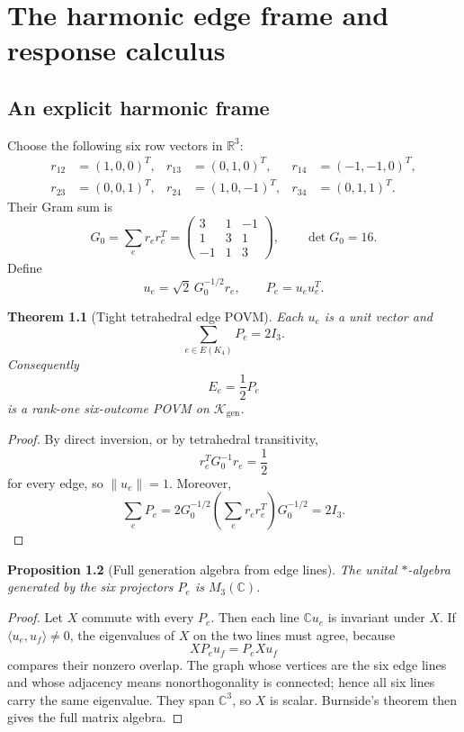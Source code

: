 \documentclass[11pt,oneside,openany]{book}
\numberwithin{equation}{chapter}
\newtheorem{theorem}{Theorem}[chapter]
\newtheorem{proposition}[theorem]{Proposition}
\theoremstyle{definition}
\theoremstyle{remark}
\newcommand{\C}{\mathbb C}
\newcommand{\R}{\mathbb R}
\newcommand{\Kgen}{\mathcal K_{\mathrm{gen}}}
\newcommand{\norm}[1]{\lVert #1\rVert}
\newcommand{\ip}[2]{\langle #1,#2\rangle}
\begin{document}
\chapter{The harmonic edge frame and response calculus}
\label{ch:edge-frame}

\section{An explicit harmonic frame}
Choose the following six row vectors in $\R^3$:
\[
\begin{aligned}
 r_{12}&=(1,0,0)^T,&
 r_{13}&=(0,1,0)^T,&
 r_{14}&=(-1,-1,0)^T,\\
 r_{23}&=(0,0,1)^T,&
 r_{24}&=(1,0,-1)^T,&
 r_{34}&=(0,1,1)^T.
\end{aligned}
\]
Their Gram sum is
\[
 G_0=\sum_er_er_e^T
 =\begin{pmatrix}3&1&-1\\1&3&1\\-1&1&3\end{pmatrix},
 \qquad \det G_0=16.
\]
Define
\[
 u_e=\sqrt2\,G_0^{-1/2}r_e,
 \qquad
 P_e=u_eu_e^T.
\]

\begin{theorem}[Tight tetrahedral edge POVM]
\label{thm:edge-povm}
Each $u_e$ is a unit vector and
\[
 \boxed{\sum_{e\in E(K_4)}P_e=2I_3.}
\]
Consequently
\[
 E_e=\frac12P_e
\]
is a rank-one six-outcome POVM on $\Kgen$.
\end{theorem}

\begin{proof}
By direct inversion, or by tetrahedral transitivity,
\[
 r_e^TG_0^{-1}r_e=\frac12
\]
for every edge, so $\norm{u_e}=1$.  Moreover,
\[
 \sum_eP_e
 =2G_0^{-1/2}\left(\sum_er_er_e^T\right)G_0^{-1/2}
 =2I_3.
\]
\end{proof}

\begin{proposition}[Full generation algebra from edge lines]
\label{prop:edge-M3}
The unital $*$-algebra generated by the six projectors $P_e$ is $M_3(\C)$.
\end{proposition}

\begin{proof}
Let $X$ commute with every $P_e$.  Then each line $\C u_e$ is invariant under $X$.  If $\ip{u_e}{u_f}\neq0$, the eigenvalues of $X$ on the two lines must agree, because
\[
 XP_eu_f=P_eXu_f
\]
compares their nonzero overlap.  The graph whose vertices are the six edge lines and whose adjacency means nonorthogonality is connected; hence all six lines carry the same eigenvalue.  They span $\C^3$, so $X$ is scalar.  Burnside's theorem then gives the full matrix algebra.
\end{proof}
\end{document}
